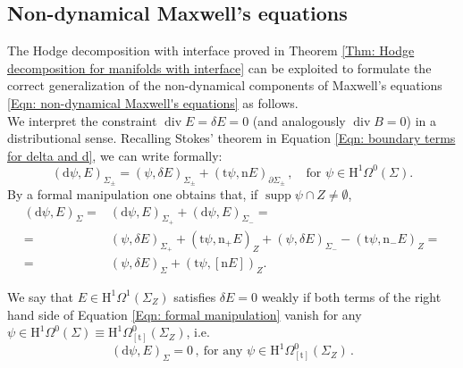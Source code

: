 \subsection{Non-dynamical Maxwell's equations}\label{Rmk: Hodge formulation of non-dynamical Maxwell's equations}
	The Hodge decomposition with interface proved in Theorem \ref{Thm: Hodge decomposition for manifolds with interface} can be exploited to formulate the correct generalization of the non-dynamical components of Maxwell's equations \eqref{Eqn: non-dynamical Maxwell's equations} as follows.\\
	We interpret the constraint $\operatorname{div} E=\delta E=0$ (and analogously $\operatorname{div} B=0$) in a distributional sense. Recalling Stokes' theorem in Equation \ref{Eqn: boundary terms for delta and d}, we can write formally:
	\begin{equation}
		(\mathrm{d}\psi,E)_{\Sigma_\pm}=(\psi,\delta E)_{\Sigma_\pm}+
		(\mathrm{t}\psi,\mathrm{n}E)_{\partial\Sigma_\pm}\,,\quad \text{for } \psi\in\mathrm{H}^1\Omega^0(\Sigma).
	\end{equation}
	By a formal manipulation one obtains that, if $\operatorname{supp}\psi \cap Z\neq\emptyset$,
	\begin{align}\label{Eqn: formal manipulation}
		\nonumber(\mathrm{d}\psi,E)_{\Sigma}=&(\mathrm{d}\psi,E)_{\Sigma_+}+(\mathrm{d}\psi,E)_{\Sigma_-}=\\ =&(\psi,\delta E)_{\Sigma_+}+		(\mathrm{t}\psi,\mathrm{n}_+E)_Z+(\psi,\delta E)_{\Sigma_-}-(\mathrm{t}\psi,\mathrm{n}_-E)_Z=\\
		\nonumber=&(\psi,\delta E)_\Sigma+(\mathrm{t}\psi,[\mathrm{n}E])_Z.
	\end{align}
	
	\begin{Definition}
		We say that $E\in \mathrm{H}^1\Omega^1(\Sigma_Z)$ satisfies $\delta E=0$ weakly if both terms of the right hand side of Equation \eqref{Eqn: formal manipulation} vanish for any $\psi\in \mathrm{H}^1\Omega^0(\Sigma)\equiv\mathrm{H}^1\Omega^0_{[\mathrm{t}]}(\Sigma_Z)$, i.e.
		\begin{equation}
			(\mathrm{d}\psi,E)_{\Sigma}=0\,,\ \text{for any } \psi\in \mathrm{H}^1\Omega^0_{[\mathrm{t}]}(\Sigma_Z)\,.
		\end{equation}
		
	\end{Definition}
	
